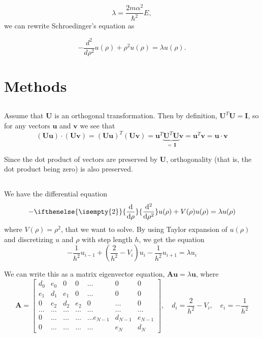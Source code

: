 \documentclass[11pt,a4paper]{article}
\newcommand\V[1]{\mathbf{#1}}                  %
\newcommand\M[1]{\begin{bmatrix} #1 \end{bmatrix}} %
\newcommand\df[3][]{{%
  \ifthenelse{\isempty{#1}}%
    {\frac{\mathrm{d}{#2}}{\mathrm{d}{#3}}}%
    {\frac{\mathrm{d}^{#1}{#2}}{{\mathrm{d}{#3}^{#1}}}}%
}}
\begin{document}
\begin{equation}
\lambda = \frac{2m\alpha^2}{\hbar^2}E,
\end{equation}
we can rewrite Schroedinger's equation as

\begin{equation}
  -\frac{d^2}{d\rho^2} u(\rho) + \rho^2u(\rho)  = \lambda u(\rho) .
\end{equation}

\section{Methods}

\subsection{}

Assume that $\V{U}$ is an orthogonal transformation. Then by definition, $\V{U}^T \V{U} = \V{I}$,
so for any vectors $\V{u}$ and $\V{v}$ we see that
\begin{equation}
  \left( \V{U} \V{u} \right) \cdot \left( \V{U} \V{v} \right)
    = \left( \V{U} \V{u} \right)^T \left( \V{U} \V{v} \right)
    = \V{u}^T \underbrace{\V{U}^T \V{U}}_{= \, \V{I}} \V{v}
    = \V{u}^T \V{v} = \V{u} \cdot \V{v}
\end{equation}

Since the dot product of vectors are preserved by $\V{U}$, orthogonality (that is, the dot product
being zero) is also preserved.

\subsection{}

We have the differential equation
\begin{equation}
  - \df[2]{}{\rho} u(\rho) + V(\rho) u(\rho) = \lambda u(\rho)
\end{equation}
where $V(\rho) = \rho^2$, that we want to solve. By using Taylor expansion of $u(\rho)$ and discretizing $u$ and $\rho$ with step length $h$, we
get the equation
\begin{equation}
  - \frac{1}{h^2} u_{i-1} + \left( \frac{2}{h^2} - V_i \right) u_i - \frac{1}{h^2} u_{i+1} = \lambda u_i
\end{equation}

We can write this as a matrix eigenvector equation, $\V{A} \V{u} = \lambda \V{u}$, where
\begin{equation}
  \V{A} = \M{
    d_0 & e_0 & 0   & 0    & \dots  &0     & 0 \\
    e_1 & d_1 & e_1 & 0    & \dots  &0     &0 \\
    0   & e_2 & d_2 & e_2  &0       &\dots & 0\\
    \dots  & \dots & \dots & \dots  &\dots      &\dots & \dots\\
    0   & \dots & \dots & \dots  &\dots  e_{N-1}     &d_{N-1} & e_{N-1}\\
    0   & \dots & \dots & \dots  &\dots       &e_{N} & d_{N}
  } , \quad
  d_i = \frac{2}{h^2} - V_i , \quad
  e_i = - \frac{1}{h^2}
\end{equation}
\end{document}
